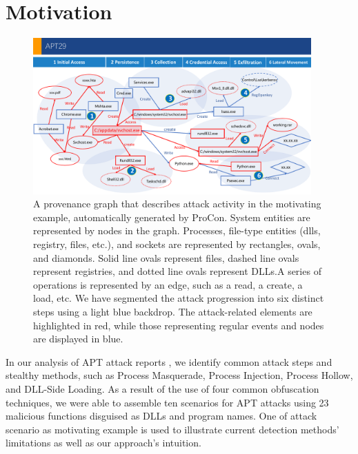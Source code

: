\section{Motivation}
\label{sec:motivation}

\begin{figure}[ht]
    \centering
    \includegraphics[width=0.95\textwidth]{figs/example.pdf}
    \caption{A provenance graph that describes attack activity in the motivating example, automatically generated by ProCon. System entities are represented by nodes in the graph. Processes, file-type entities (dlls, registry, files, etc.), and sockets are represented by rectangles, ovals, and diamonds. Solid line ovals represent files, dashed line ovals represent registries, and dotted line ovals represent DLLs.A series of operations is represented by an edge, such as a read, a create, a load, etc. We have segmented the attack progression into six distinct steps using a light blue backdrop. The attack-related elements are highlighted in red, while those representing regular events and nodes are displayed in blue.}
    \label{fig-example} 
    \end{figure}

In our analysis of APT attack reports \cite{eclecticiq2023,microsoft2023,paloaltonetworks2023}, we identify common attack steps and stealthy methods, such as Process Masquerade, Process Injection, Process Hollow, and DLL-Side Loading\cite{eclecticiq2023}. As a result of the use of four common obfuscation techniques, we were able to assemble ten scenarios for APT attacks using 23 malicious functions disguised as DLLs and program names.
One of attack scenario as motivating example is used to illustrate current detection methods' limitations as well as our approach's intuition.


